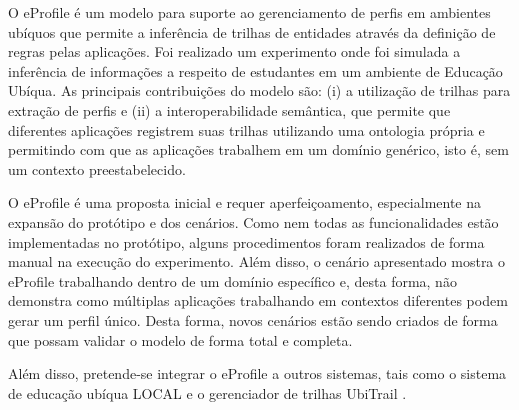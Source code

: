 \documentclass[times, 10pt, twocolumn]{article}
\begin{document}
\label{sec:conclusao}

O eProfile é um modelo para suporte ao gerenciamento de perfis em ambientes ubíquos que permite a inferência de trilhas de entidades através da definição de regras pelas aplicações. Foi realizado um experimento onde foi simulada a inferência de informações a respeito de estudantes em um ambiente de Educação Ubíqua. As principais contribuições do modelo são: (i) a utilização de trilhas para extração de perfis e (ii) a interoperabilidade semântica, que permite que diferentes aplicações registrem suas trilhas utilizando uma ontologia própria e permitindo com que as aplicações trabalhem em um domínio genérico, isto é, sem um contexto preestabelecido.

O eProfile é uma proposta inicial e requer aperfeiçoamento, especialmente na expansão do protótipo e dos cenários. Como nem todas as funcionalidades estão implementadas no protótipo, alguns procedimentos foram realizados de forma manual na execução do experimento. Além disso, o cenário apresentado mostra o eProfile trabalhando dentro de um domínio específico e, desta forma, não demonstra como múltiplas aplicações trabalhando em contextos diferentes podem gerar um perfil único. Desta forma, novos cenários estão sendo criados de forma que possam validar o modelo de forma total e completa.

Além disso, pretende-se integrar o eProfile a outros sistemas, tais como o sistema de educação ubíqua LOCAL \cite{barbosa08} e o gerenciador de trilhas UbiTrail \cite{silva09}.



\end{document}
